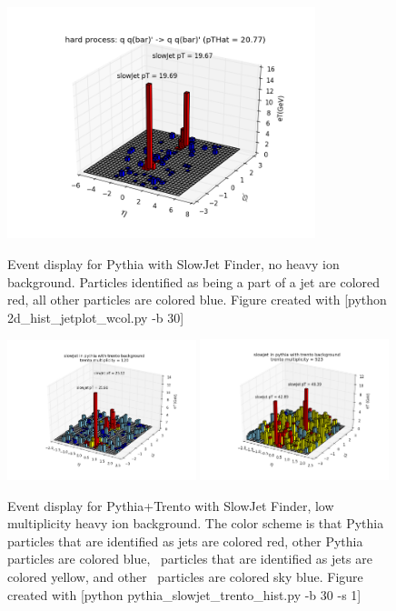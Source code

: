 \documentclass[11pt]{article}
\begin{document}
\begin{figure}[h]
\begin{center}
\includegraphics[width=0.8\textwidth]{2d_hist_jetplot_wcol.png}
\label{fig_label}
\caption{Event display for Pythia with SlowJet Finder, no heavy ion background.  Particles identified as being a part of a jet are colored red, all other particles are colored blue. Figure created with [python 2d\_hist\_jetplot\_wcol.py -b 30]}
\end{center}
\end{figure}

\begin{figure}[h]
\begin{center}
\includegraphics[width=0.49\textwidth]{pythia_slowjet_trento_hist1.png}
\includegraphics[width=0.49\textwidth]{pythia_slowjet_trento_hist2.png}
\label{fig_label}
\caption{Event display for Pythia+Trento with SlowJet Finder, low multiplicity heavy ion background. The color scheme is that Pythia particles that are identified as jets are colored red, other Pythia particles are colored blue, \trento\ particles that are identified as jets are colored yellow, and other \trento\ particles are colored sky blue. Figure created with [python pythia\_slowjet\_trento\_hist.py -b 30 -s 1]}
\end{center}
\end{figure}
\end{document}
